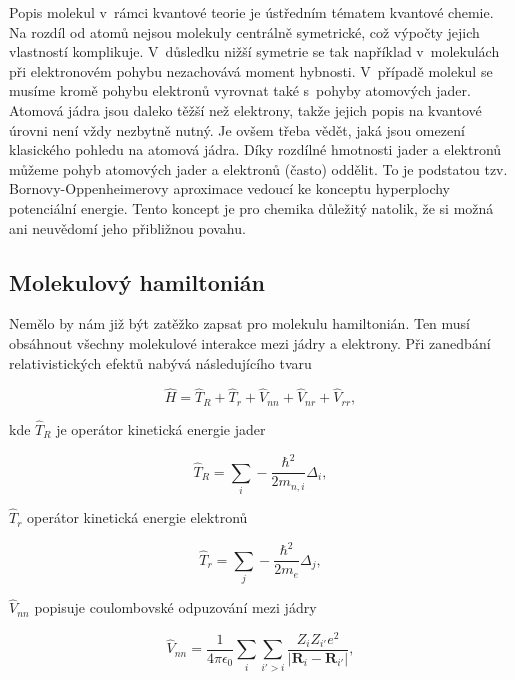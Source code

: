 Popis molekul v~rámci kvantové teorie je ústředním tématem kvantové chemie. Na rozdíl od atomů nejsou molekuly centrálně symetrické, což výpočty jejich vlastností komplikuje. V~důsledku nižší symetrie se tak například v~molekulách při elektronovém pohybu nezachovává moment hybnosti. V~případě molekul se musíme kromě pohybu elektronů vyrovnat také s~pohyby atomových jader. Atomová jádra jsou daleko těžší než elektrony, takže jejich popis na kvantové úrovni není vždy nezbytně nutný. Je ovšem třeba vědět, jaká jsou omezení klasického pohledu na atomová jádra. Díky rozdílné hmotnosti jader a elektronů můžeme pohyb atomových jader a elektronů (často) oddělit. To je podstatou tzv. Bornovy-Oppenheimerovy aproximace vedoucí ke konceptu hyperplochy potenciální energie. Tento koncept je pro chemika důležitý natolik, že si možná ani neuvědomí jeho přibližnou povahu.  


\subsection{Molekulový hamiltonián}


Nemělo by nám již být zatěžko zapsat pro molekulu hamiltonián. Ten musí obsáhnout všechny molekulové interakce mezi jádry a elektrony. Při zanedbání relativistických efektů nabývá následujícího tvaru

\begin{equation}
\hat{H}=\hat{T}_R+\hat{T}_r+\hat{V}_{nn}+\hat{V}_{nr}+\hat{V}_{rr}, 
\label{rov:mol-Hamiltonian}
\end{equation}

\noindent kde $\hat{T}_R$ je operátor kinetická energie jader

\begin{equation}
\hat{T}_R=\sum_i	-\frac{\hbar^2}{2m_{n,i}}\Delta_{i}, 	
\end{equation}

\noindent $\hat{T}_r$ operátor kinetická energie elektronů

\begin{equation}
\hat{T}_r=\sum_j	-\frac{\hbar^2}{2m_{e}}\Delta_{j}, 	
\end{equation}

\noindent $\hat{V}_{nn}$ popisuje coulombovské odpuzování mezi jádry

\begin{equation}
\hat{V}_{nn}=\frac{1}{4\pi\epsilon_0}\sum_i\sum_{i'>i}\frac{Z_iZ_{i'} e^2}{ \left\vert \textbf{R}_i - \textbf{R}_{i'}\right\vert } , 	
\end{equation}

